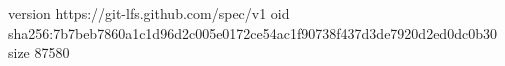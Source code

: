 version https://git-lfs.github.com/spec/v1
oid sha256:7b7beb7860a1c1d96d2c005e0172ce54ac1f90738f437d3de7920d2ed0dc0b30
size 87580
